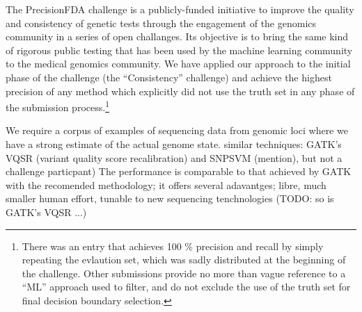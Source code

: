 \documentclass{article}
\begin{document}
The PrecisionFDA challenge is a publicly-funded initiative to improve the quality and consistency of genetic tests through the engagement of the genomics community in a series of open challanges.
Its objective is to bring the same kind of rigorous public testing that has been used by the machine learning community to the medical genomics community.
We have applied our approach to the initial phase of the challenge (the ``Consistency'' challenge) and achieve the highest precision of any method which explicitly did not use the truth set in any phase of the submission process.\footnote{There was an entry that achieves 100 \% precision and recall by simply repeating the evlaution set, which was sadly distributed at the beginning of the challenge. Other submissions provide no more than vague reference to a ``ML'' approach used to filter, and do not exclude the use of the truth set for final decision boundary selection.}




We require a corpus of examples of sequencing data from genomic loci where we have a strong estimate of the actual genome state. %
 similar techniques: GATK's VQSR (variant quality score recalibration) and SNPSVM (mention), but not a challenge particpant)
The performance is comparable to that achieved by GATK with the recomended methodology; it offers several adavantges; libre, much smaller human effort, tunable to new sequencing tenchnologies (TODO: so is GATK's VQSR ...) 
\end{document}
